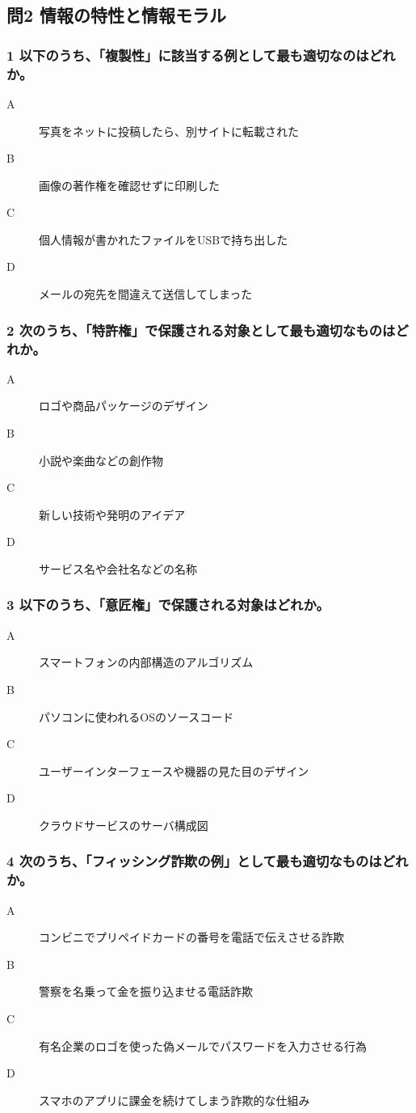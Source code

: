 \documentclass[a4paper,6pt]{jsarticle}
\begin{document}
\subsection*{問2 情報の特性と情報モラル}

\subsubsection*{1 以下のうち、「複製性」に該当する例として最も適切なのはどれか。}
\begin{description}
  \item[A] 写真をネットに投稿したら、別サイトに転載された
  \item[B] 画像の著作権を確認せずに印刷した
  \item[C] 個人情報が書かれたファイルをUSBで持ち出した
  \item[D] メールの宛先を間違えて送信してしまった
\end{description}

\subsubsection*{2 次のうち、「特許権」で保護される対象として最も適切なものはどれか。}
\begin{description}
  \item[A] ロゴや商品パッケージのデザイン
  \item[B] 小説や楽曲などの創作物
  \item[C] 新しい技術や発明のアイデア
  \item[D] サービス名や会社名などの名称
\end{description}

\subsubsection*{3 以下のうち、「意匠権」で保護される対象はどれか。}
\begin{description}
  \item[A] スマートフォンの内部構造のアルゴリズム
  \item[B] パソコンに使われるOSのソースコード
  \item[C] ユーザーインターフェースや機器の見た目のデザイン
  \item[D] クラウドサービスのサーバ構成図
\end{description}

\subsubsection*{4 次のうち、「フィッシング詐欺の例」として最も適切なものはどれか。}
\begin{description}
  \item[A] コンビニでプリペイドカードの番号を電話で伝えさせる詐欺
  \item[B] 警察を名乗って金を振り込ませる電話詐欺
  \item[C] 有名企業のロゴを使った偽メールでパスワードを入力させる行為
  \item[D] スマホのアプリに課金を続けてしまう詐欺的な仕組み
\end{description}
\end{document}
